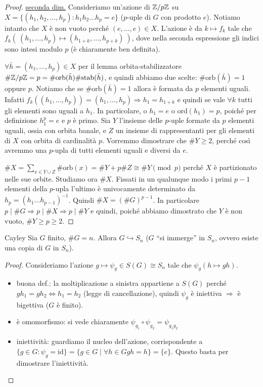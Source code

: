 \begin{proof}
\underline{seconda dim.}
    Consideriamo un'azione di $\mathbb{Z}/p\mathbb{Z}$ su $X = \{ (h_1,h_2,\dots,h_p) : h_1h_2\dots h_p = e \}$ ($p$-uple di $G$ con prodotto $e$). Notiamo intanto che $X$ è non vuoto perché $(e,\dots, e) \in X$. L'azione è da $k \mapsto f_k$ tale che $f_k(\ (h_1,\dots,h_p) \mapsto (h_{1+k},\dots,h_{p+k}) \ )$, dove nella seconda espressione gli indici sono intesi modulo $p$ (è chiaramente ben definita).
    
    $\forall \bar h = (h_1,\dots,h_p) \in X$ per il lemma orbita-stabilizzatore $\#\mathbb{Z}/p\mathbb{Z} = p = \#\text{orb}(\bar h) \#\text{stab}(\bar h)$, e quindi abbiamo due scelte: $ \#\text{orb}(\bar h) = 1$ oppure $p$. Notiamo che se $\#\text{orb}( \bar h ) = 1$ allora è formata da $p$ elementi uguali. Infatti $f_k( (h_1,\dots,h_p) ) = (h_1,\dots,h_p) \Rightarrow h_1 = h_{1+k}$ e quindi se vale $\forall k$ tutti gli elementi sono uguali a $h_1$. In particolare, o $h_1 = e$ o $\text{ord}(h_1) = p$, poiché per definizione $h_1^p = e$ e $p$ è primo. Sia $Y$ l'insieme delle $p$-uple formate da $p$ elementi uguali, ossia con orbita banale, e $Z$ un insieme di rappresentanti per gli elementi di $X$ con orbita di cardinalità $p$. Vorremmo dimostrare che $\#Y \geq 2$, perché così avremmo una $p$-upla di tutti elementi uguali e diversi da $e$.
    
    $\#X = \sum_{x \in Y \cup Z} \#\text{orb}(x) = \#Y + p\#Z \cong \#Y \pmod{p}$ perché $X$ è partizionato nelle sue orbite. Studiamo ora $\#X$. Fissati in un qualunque modo i primi $p-1$ elementi della $p$-upla l'ultimo è univocamente determinato da $h_p = (h_1\dots h_{p-1})^{-1}$. Quindi $\# X = (\#G)^{p-1}$. In particolare $p \mid \#G \Rightarrow p \mid \#X \Rightarrow p \mid \#Y$ e quindi, poiché abbiamo dimostrato che $Y$ è non vuoto, $\#Y \geq p \geq 2$.
\end{proof}
\begin{theorem}{Cayley}
    Sia $G$ finito, $\#G = n$. Allora $G \hookrightarrow S_n$ ($G$ ``si immerge'' in $S_n$, ovvero esiste una copia di $G$ in $S_n$).
\end{theorem}
\begin{proof}
    Consideriamo l'azione $g \mapsto \psi_g \in S(G) \cong S_n$ tale che $\psi_g(h \mapsto gh)$.
    \begin{itemize}
        \item buona def.: la moltiplicazione a sinistra appartiene a $S(G)$ perché $gh_1 = gh_2 \iff h_1 = h_2$ (legge di cancellazione), quindi $\psi_g$ è iniettiva $\Rightarrow$ è bigettiva ($G$ è finito).
        \item è omomorfismo: si vede chiaramente $\psi_{g_1} \circ \psi_{g_2} = \psi_{g_1g_2}$
        \item iniettività: guardiamo il nucleo dell'azione, corrispondente a $\{g \in G : \psi_g = \text{id}\} = \{g \in G \mid \forall h \in G gh = h \} = \{e\}$. Questo basta per dimostrare l'iniettività.
    \end{itemize}
\end{proof}

